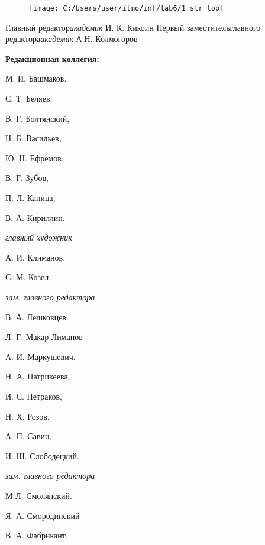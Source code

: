 
\thispagestyle{empty}
\vspace{-1cm}\begin{figure}
	\centering
	\texttt{[image: C:/Users/user/itmo/inf/lab6/1\_str\_top]}
\end{figure}
\begin{minipage}{0.25\linewidth}\vspace{-0.1cm}
	Главный редактор\newline\textit{академик} И. К. Кикоин
	\newline\newline
	Первый заместитель\newline главного редактора\newline \textit{академик} А.Н. Колмогоров\newline\newline
	
	\textbf{Редакционная коллегия:}\vspace{0.05cm}
	
	М. И. Башмаков.
	
	С. Т. Беляев.
	
	В. Г. Болтянский,
	
	Н. Б. Васильев,
	
	Ю. Н. Ефремов.
	
	В. Г. Зубов,
	
	П. Л. Капица,
	
	В. А. Кириллин.\vspace{0.1cm}
	
	\textit{главный художник}
	
	А. И. Климанов.
	
	С. М. Козел.\vspace{0.1cm}
	
	\textit{зам. главного редактора}
	
	В. А. Лешковцев.
	
	Л. Г. Макар-Лиманов
	
	А. И. Маркушевич.
	
	Н. А. Патрикеева,
	
	И. С. Петраков,
	
	Н. Х. Розов,
	
	А. П. Савин.
	
	И. Ш. Слободецкий.\vspace{0.1cm}
	
	\textit{зам. главного редактора}
	
	М Л. Смолянский.
	
	Я. А. Смородинский
	
	В. А. Фабрикант,
	

\end{minipage}
